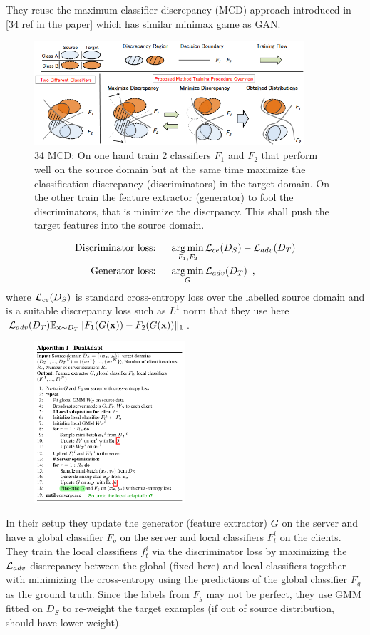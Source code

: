 They reuse the maximum classifier discrepancy (MCD) approach introduced in [34 ref in the paper] which has similar minimax game as GAN.
\begin{figure}[ht]
\centering
\includegraphics[width=10cm]{fmtda_Figure3.png}
\caption{34 MCD: On one hand train 2 classifiers $F_1$ and $F_2$ that perform well on the source domain but at the same time maximize the classification discrepancy (discriminators) in the target domain. On the other train the feature extractor (generator) to fool the discriminators, that is minimize the discrpancy. This shall push the target features into the source domain.}
\end{figure}
\begin{align*}
\text{Discriminator loss: } \quad & \operatorname*{arg\,min}_{F_1, F_2} \mathcal{L}_{ce}(D_S) - \mathcal{L}_{adv}(D_T) \\
\text{Generator loss: } \quad & \operatorname*{arg\,min}_{G} \mathcal{L}_{adv}(D_T) \enspace , 
\end{align*}
where $\mathcal{L}_{ce}(D_S)$ is standard cross-entropy loss over the labelled source domain and is a suitable discrepancy loss such as $L^1$ norm that they use here $\mathcal{L}_{adv}(D_T) \mathbb{E}_{{\mathbf{x}} \sim D_T} \Vert F_1(G({\mathbf{x}})) - F_2(G({\mathbf{x}})) \Vert_1$.
\begin{figure}
\centering
\includegraphics[width=0.5\textwidth]{fmtda_Algo.png}
\end{figure}

In their setup they update the generator (feature extractor) $G$ on the server and have a global classifier $F_g$ on the server and local classifiers $F_t^i$ on the clients.
They train the local classifiers $f_t^i$ via the discriminator loss by maximizing the $\mathcal{L}_{adv}$ discrepancy between the global (fixed here) and local classifiers together with minimizing the cross-entropy using the predictions of the global classifier $F_g$ as the ground truth.
Since the labels from $F_g$ may not be perfect, they use GMM fitted on $D_S$ to re-weight the target examples (if out of source distribution, should have lower weight).

